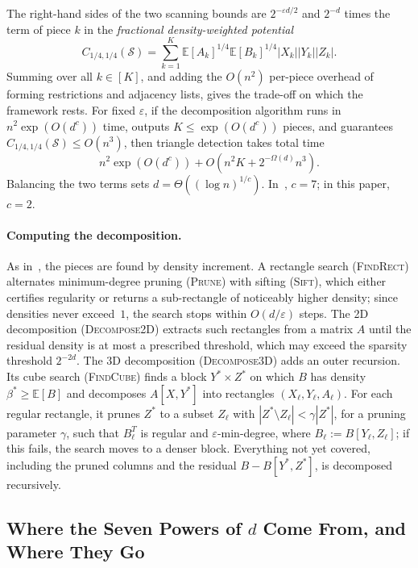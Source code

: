 \documentclass[11pt]{article}
\theoremstyle{definition}
\renewcommand{\label}[1]{}%
\newcommand{\E}{\mathbb{E}}
\newcommand{\abs}[1]{\left\lvert #1 \right\rvert}
\newcommand{\dens}[1]{\E[#1]}
\newcommand{\pot}{C_{1/4,1/4}}
\newcommand{\Prune}{\textnormal{\textsc{Prune}}}
\newcommand{\Sift}{\textnormal{\textsc{Sift}}}
\newcommand{\FindRect}{\textnormal{\textsc{FindRect}}}
\newcommand{\DecomposeTwoD}{\textnormal{\textsc{Decompose2D}}}
\newcommand{\FindCube}{\textnormal{\textsc{FindCube}}}
\newcommand{\DecomposeThreeD}{\textnormal{\textsc{Decompose3D}}}
\begin{document}
The right-hand sides of the two scanning bounds are $2^{-\varepsilon d / 2}$ and $2^{-d}$ times the term of piece $k$ in the \emph{fractional density-weighted potential}
\[
    \pot(\mathcal{S}) = \sum_{k=1}^K \dens{A_k}^{1/4}\dens{B_k}^{1/4}\abs{X_k}\abs{Y_k}\abs{Z_k}.
\]
Summing over all $k \in [K]$, and adding the $O(n^2)$ per-piece overhead of forming restrictions and adjacency lists, gives the trade-off on which the framework rests. For fixed $\varepsilon$, if the decomposition algorithm runs in $n^2 \exp(O(d^c))$ time, outputs $K \le \exp(O(d^c))$ pieces, and guarantees $\pot(\mathcal{S}) \le O(n^3)$, then triangle detection takes total time
\[
    n^2 \exp(O(d^c)) + O\!\left(n^2 K + 2^{-\Omega(d)} n^3\right).
\]
Balancing the two terms sets $d = \Theta((\log n)^{1/c})$. In~\cite{AFKLM24}, $c = 7$; in this paper, $c = 2$.

\paragraph{Computing the decomposition.}
As in~\cite{AFKLM24}, the pieces are found by density increment. A rectangle search (\FindRect{}) alternates minimum-degree pruning (\Prune{}) with sifting (\Sift{}), which either certifies regularity or returns a sub-rectangle of noticeably higher density; since densities never exceed~$1$, the search stops within $O(d/\varepsilon)$ steps. The 2D decomposition (\DecomposeTwoD{}) extracts such rectangles from a matrix $A$ until the residual density is at most a prescribed threshold, which may exceed the sparsity threshold $2^{-2d}$. The 3D decomposition (\DecomposeThreeD{}) adds an outer recursion. Its cube search (\FindCube{}) finds a block $Y^* \times Z^*$ on which $B$ has density $\beta^* \ge \dens{B}$ and decomposes $A[X, Y^*]$ into rectangles $(X_\ell, Y_\ell, A_\ell)$. For each regular rectangle, it prunes $Z^*$ to a subset $Z_\ell$ with $\abs{Z^* \setminus Z_\ell} < \gamma\abs{Z^*}$, for a pruning parameter $\gamma$, such that $B_\ell^T$ is regular and $\varepsilon$-min-degree, where $B_\ell := B[Y_\ell, Z_\ell]$; if this fails, the search moves to a denser block. Everything not yet covered, including the pruned columns and the residual $B - B[Y^*, Z^*]$, is decomposed recursively.

\subsection{Where the Seven Powers of \texorpdfstring{$d$}{d} Come From, and Where They Go}
\label{sec:overview-table}
\end{document}
